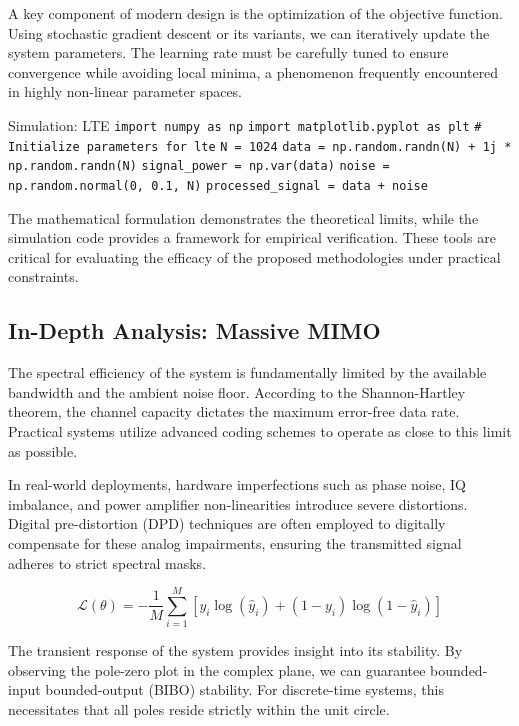 A key component of modern design is the optimization of the objective function. Using stochastic gradient descent or its variants, we can iteratively update the system parameters. The learning rate must be carefully tuned to ensure convergence while avoiding local minima, a phenomenon frequently encountered in highly non-linear parameter spaces.

\begin{pythonbox}{Simulation: LTE}
\texttt{import numpy as np}
\texttt{import matplotlib.pyplot as plt}
\texttt{}
\texttt{\# Initialize parameters for lte}
\texttt{N = 1024}
\texttt{data = np.random.randn(N) + 1j * np.random.randn(N)}
\texttt{signal\_power = np.var(data)}
\texttt{noise = np.random.normal(0, 0.1, N)}
\texttt{processed\_signal = data + noise}
\end{pythonbox}

\vspace{0.5cm}
The mathematical formulation demonstrates the theoretical limits, while the simulation code provides a framework for empirical verification. These tools are critical for evaluating the efficacy of the proposed methodologies under practical constraints.


\subsection{In-Depth Analysis: Massive MIMO}
The spectral efficiency of the system is fundamentally limited by the available bandwidth and the ambient noise floor. According to the Shannon-Hartley theorem, the channel capacity dictates the maximum error-free data rate. Practical systems utilize advanced coding schemes to operate as close to this limit as possible.

In real-world deployments, hardware imperfections such as phase noise, IQ imbalance, and power amplifier non-linearities introduce severe distortions. Digital pre-distortion (DPD) techniques are often employed to digitally compensate for these analog impairments, ensuring the transmitted signal adheres to strict spectral masks.

\begin{equation}
    \mathcal{L}(\theta) = -\frac{1}{M} \sum_{i=1}^{M} \left[ y_i \log(\hat{y}_i) + (1-y_i)\log(1-\hat{y}_i) \right]
\end{equation}

The transient response of the system provides insight into its stability. By observing the pole-zero plot in the complex plane, we can guarantee bounded-input bounded-output (BIBO) stability. For discrete-time systems, this necessitates that all poles reside strictly within the unit circle.


